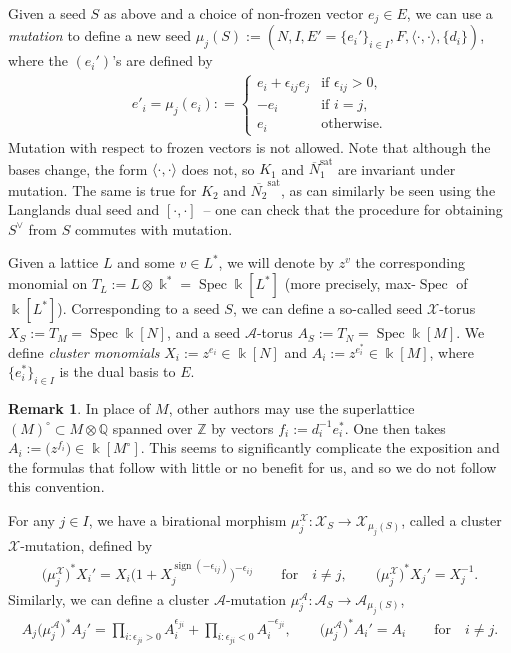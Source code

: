 \documentclass[10pt,a4paper]{amsart}
\numberwithin{equation}{section}
\numberwithin{figure}{section}
\numberwithin{table}{section}
\DeclareMathOperator{\Spec}{Spec}
\DeclareMathOperator{\sign}{sign}
\DeclareMathOperator{\sat}{sat}
\let\?=\overline
\let\bb=\mathbb
\let\rar=\rightarrow
\let\s=\mathcal
\let\mb=\mbox
\newcommand {\kk} {\Bbbk}
\theoremstyle{definition}
\newtheorem{rmk}[thm]{Remark}
\begin{document}
Given a seed $S$ as above and a choice of non-frozen vector $e_j\in E$, we can use a {\it mutation} to define a new seed $\mu_j(S):=(N,I,E'=\{e_i'\}_{i\in I},F,\langle\cdot,\cdot\rangle,\{d_i\})$, where the $(e_i')$'s are defined by
\begin{gather}\label{seedmut}
 e'_{i} = \mu_{j}(e_{i}): = \begin{cases}
 e_{i}+\epsilon_{ij}e_{j} &\mb{if $\epsilon_{ij} >0$}, \\
 -e_{i} &\mb{if $i=j$}, \\
	e_{i} &\mb{otherwise}.
	\end{cases}
\end{gather}
Mutation with respect to frozen vectors is not allowed. Note that although the bases change, the form $\langle \cdot,\cdot\rangle$ does not, so $K_1$ and $\?{N}_1^{\sat}$ are invariant under mutation. The same is true for $K_2$ and $\?{N_2}^{\sat}$, as can similarly be seen using the Langlands dual seed and $[\cdot,\cdot]$~-- one can check that the procedure for obtaining $S^{\vee}$ from $S$ commutes with mutation.

Given a lattice $L$ and some $v\in L^*$, we will denote by $z^v$ the corresponding monomial on $T_L:=L\otimes \kk^*=\Spec \kk[L^*]$ (more precisely, max-$\Spec$ of $\kk[L^*]$). Corresponding to a seed $S$, we can define a so-called seed $\s{X}$-torus $X_S:=T_{M}=\Spec \kk[N]$, and a seed $\s{A}$-torus $A_S:=T_{N}=\Spec \kk[M]$.
 We define {\it cluster monomials} $X_i:=z^{e_i}\in \kk[N]$ and $A_i:=z^{e_i^*}\in \kk[M]$, where $\{ e_i^*\}_{i\in I}$ is the dual basis to $E$.

\begin{rmk}\label{convention-departure}In place of $M$, other authors may use the superlattice $(M)^{\circ}\subset M\otimes \bb{Q}$ spanned over $\bb{Z}$ by vectors $f_i:=d_i^{-1}e_i^*$. One then takes $A_i:=\big(z^{f_i}\big) \in \kk[M^{\circ}]$. This seems to significantly complicate the exposition and the formulas that follow with little or no benefit for us, and so we do not follow this convention.
\end{rmk}

For any $j\in I$, we have a birational morphism $\mu_j^{\s{X}}\colon \s{X}_S\rar \s{X}_{\mu_j(S)}$, called a cluster $\s{X}$-mutation, defined by
\begin{gather*}
	\big(\mu_j^{\s{X}}\big)^* X_i' = 	X_i\big(1+X_j^{\sign(-\epsilon_{ij})}\big)^{-\epsilon_{ij}} \qquad \text{for} \quad i\neq j, \qquad \big(\mu_j^{\s{X}}\big)^* X_j' = X_j^{-1} .
\end{gather*}
Similarly, we can define a cluster $\s{A}$-mutation $\mu_j^{\s{A}}\colon \s{A}_S\rar \s{A}_{\mu_j(S)}$,
\begin{gather*}
	A_{j}\big(\mu_j^{\s{A}}\big)^* A_{j}' =\prod_{i\colon \epsilon_{ji}>0} A_{i}^{\epsilon_{ji}} + \prod_{i\colon \epsilon_{ji}<0} A_{i}^{-\epsilon_{ji}},\qquad \big(\mu_j^{\s{A}}\big)^*	A_{i}'=A_{i} \qquad \text{for} \quad i\neq j.
\end{gather*}
\end{document}
